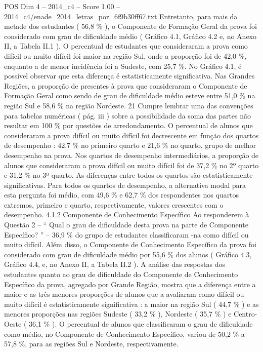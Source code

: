 \begin{textsample}{POS Dim 4 – 2014\_c4 – Score 1.00 – 2014\_c4/enade\_2014\_letras\_por\_6f9b30ff67.txt}
Entretanto, para mais da metade dos estudantes ( 56,8 \% ), o Componente de Formação Geral da prova foi considerado com grau de dificuldade médio ( Gráfico 4.1, Gráfico 4.2 e, no Anexo II, a Tabela II.1 ).
O percentual de estudantes que consideraram a prova como difícil ou muito difícil foi maior na região Sul, onde a proporção foi de 42,0 \%, enquanto a de menor incidência foi a Sudeste, com 25,7 \%.
No Gráfico 4.1, é possível observar que esta diferença é estatisticamente significativa.
Nas Grandes Regiões, a proporção de presentes à prova que consideraram o Componente de Formação Geral como sendo de grau de dificuldade médio esteve entre 51,0 \% na região Sul e 58,6 \% na região Nordeste. 21 Cumpre lembrar uma das convenções para tabelas numéricas ( pág. iii ) sobre a possibilidade da soma das partes não resultar em 100 \% por questões de arredondamento.
O percentual de alunos que consideraram a prova difícil ou muito difícil foi decrescente em função dos quartos de desempenho : 42,7 \% no primeiro quarto e 21,6 \% no quarto, grupo de melhor desempenho na prova.
Nos quartos de desempenho intermediários, a proporção de alunos que consideraram a prova difícil ou muito difícil foi de 37,2 \% no 2º quarto e 31,2 \% no 3º quarto.
As diferenças entre todos os quartos são estatisticamente significativas.
Para todos os quartos de desempenho, a alternativa modal para esta pergunta foi médio, com 49,6 \% e 62,7 \% dos respondentes nos quartos extremos, primeiro e quarto, respectivamente, valores crescentes com o desempenho. 4.1.2 Componente de Conhecimento Específico Ao responderem à Questão 2 – “ Qual o grau de dificuldade desta prova na parte de Componente Específico? ” – 36,9 \% do grupo de estudantes classificaram -na como difícil ou muito difícil.
Além disso, o Componente de Conhecimento Específico da prova foi considerado com grau de dificuldade médio por 55,6 \% dos alunos ( Gráfico 4.3, Gráfico 4.4, e, no Anexo II, a Tabela II.2 ).
A análise das respostas dos estudantes quanto ao grau de dificuldade do Componente de Conhecimento Específico da prova, agregado por Grande Região, mostra que a diferença entre a maior e as três menores proporções de alunos que a avaliaram como difícil ou muito difícil é estatisticamente significativa : a maior na região Sul ( 44,7 \% ) e as menores proporções nas regiões Sudeste ( 33,2 \% ), Nordeste ( 35,7 \% ) e Centro-Oeste ( 36,1 \% ).
O percentual de alunos que classificaram o grau de dificuldade como médio, no Componente de Conhecimento Específico, variou de 50,2 \% a 57,8 \%, para as regiões Sul e Nordeste, respectivamente.

\end{textsample}
